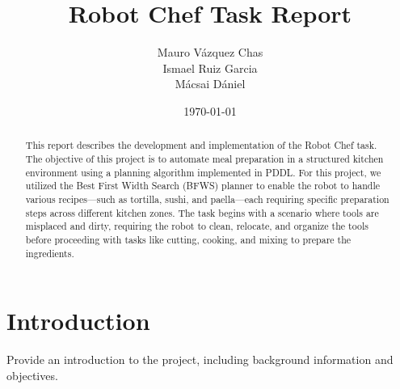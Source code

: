 \documentclass[a4paper,12pt]{article}
\title{Robot Chef Task Report}
\author{Mauro Vázquez Chas \\
Ismael Ruiz Garcia \\
Mácsai Dániel
}
\date{\today}
\begin{document}
\maketitle

\begin{abstract}
    This report describes the development and implementation of the Robot Chef task. The objective of this project is to automate meal preparation in a structured kitchen environment using a planning algorithm implemented in PDDL. For this project, we utilized the Best First Width Search (BFWS) planner to enable the robot to handle various recipes—such as tortilla, sushi, and paella—each requiring specific preparation steps across different kitchen zones. The task begins with a scenario where tools are misplaced and dirty, requiring the robot to clean, relocate, and organize the tools before proceeding with tasks like cutting, cooking, and mixing to prepare the ingredients.
\end{abstract}

\tableofcontents

\section{Introduction}
\label{sec:introduction}
Provide an introduction to the project, including background information and objectives.
\end{document}
